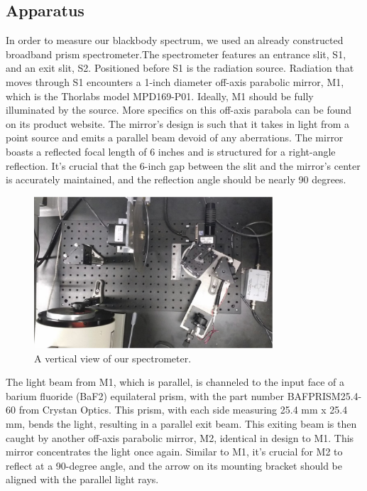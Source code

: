 \documentclass[10pt,letterpaper,onecolumn]{article}
\begin{document}
\subsection{Apparatus}
In order to measure our blackbody spectrum, we used an already constructed
broadband prism spectrometer.The spectrometer features an entrance slit, 
S1, and an exit slit, S2. 
Positioned before S1 is the radiation source. 
Radiation that moves through S1 encounters a 1-inch diameter off-axis 
parabolic mirror, M1, which is the Thorlabs model MPD169-P01. Ideally, 
M1 should be fully illuminated by the source. More specifics on this 
off-axis parabola can be found on its product website. The mirror's design 
is such that it takes in light from a point source and emits a parallel beam 
devoid of any aberrations. The mirror boasts a reflected focal length of 
6 inches and is structured for a right-angle reflection. It's crucial that 
the 6-inch gap between the slit and the mirror's center is accurately
maintained, and the reflection angle should be nearly 90 degrees.
\begin{figure}[ht]
 \begin{center}
 \includegraphics*[width=3.5in]{Apparatus_1.jpg}
 \caption{A vertical view of our spectrometer.\label{fig:apparatus_1} }
 \end{center}
\end{figure}
The light beam from M1, which is parallel, is channeled to the input 
face of a barium fluoride (BaF2) equilateral prism, with the part number 
BAFPRISM25.4-60 from Crystan Optics. This prism, with each side measuring 
25.4 mm x 25.4 mm, bends the light, resulting in a parallel exit beam. 
This exiting beam is then caught by another off-axis parabolic mirror, 
M2, identical in design to M1. This mirror concentrates the light once again. 
Similar to M1, it's crucial for M2 to reflect at a 90-degree angle,
and the arrow on its mounting bracket should be aligned with the parallel 
light rays.
\end{document}
